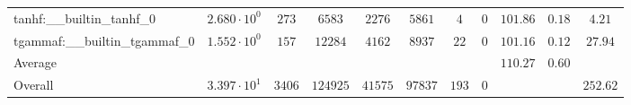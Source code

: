 \begin{tabular}{|l|c|c|c|c|c|c|c|c|c|c|}
tanhf:\_\_builtin\_tanhf\_0               & $ 2.680 \cdot 10^{0}  $ & $ 273    $ & $ 6583   $ & $ 2276  $ & $ 5861  $ & $ 4   $ & $ 0 $ & $ 101.86      $ & $ 0.18    $ & $ 4.21    $ \\
tgammaf:\_\_builtin\_tgammaf\_0           & $ 1.552 \cdot 10^{0}  $ & $ 157    $ & $ 12284  $ & $ 4162  $ & $ 8937  $ & $ 22  $ & $ 0 $ & $ 101.16      $ & $ 0.12    $ & $ 27.94   $ \\
\hline
Average                                   & $                     $ & $        $ & $        $ & $       $ & $       $ & $     $ & $   $ & $ 110.27      $ & $ 0.60    $ & $         $ \\
\hline
Overall                                   & $ 3.397 \cdot 10^{1}  $ & $ 3406   $ & $ 124925 $ & $ 41575 $ & $ 97837 $ & $ 193 $ & $ 0 $ & $             $ & $         $ & $ 252.62  $ \\
\hline
\end{tabular}
